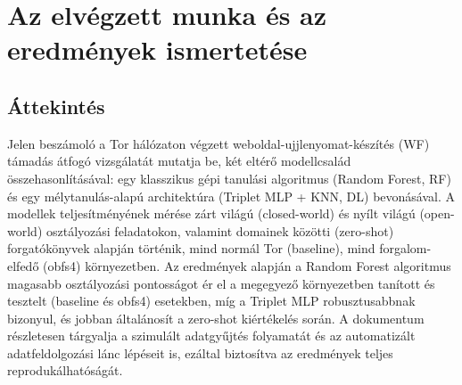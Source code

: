 \documentclass[a4paper,oneside]{article}
\begin{document}
\section{Az elvégzett munka és az eredmények ismertetése}
\label{sec:az-elvegzett-munka}


\subsection{Áttekintés}

Jelen beszámoló a Tor hálózaton végzett weboldal-ujjlenyomat-készítés (WF) támadás átfogó vizsgálatát mutatja be, két eltérő modellcsalád összehasonlításával: egy klasszikus gépi tanulási algoritmus (Random Forest, RF) és egy mélytanulás-alapú architektúra (Triplet MLP + KNN, DL) bevonásával.
A modellek teljesítményének mérése zárt világú (closed-world) és nyílt világú (open-world) osztályozási feladatokon, valamint domainek közötti (zero-shot) forgatókönyvek alapján történik, mind normál Tor (baseline), mind forgalom-elfedő (obfs4) környezetben.
Az eredmények alapján a Random Forest algoritmus magasabb osztályozási pontosságot ér el a megegyező környezetben tanított és tesztelt (baseline és obfs4) esetekben, míg a Triplet MLP robusztusabbnak bizonyul, és jobban általánosít a zero-shot kiértékelés során.
A dokumentum részletesen tárgyalja a szimulált adatgyűjtés folyamatát és az automatizált adatfeldolgozási lánc lépéseit is, ezáltal biztosítva az eredmények teljes reprodukálhatóságát.
\end{document}

